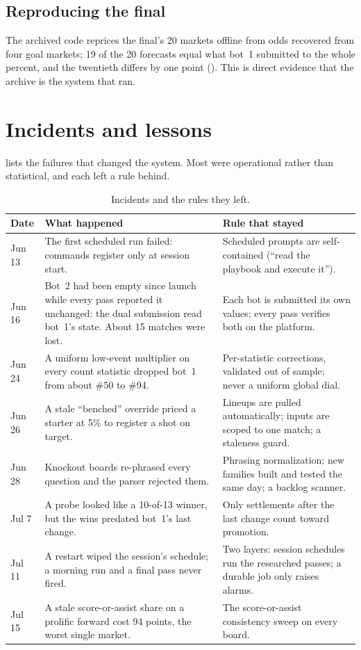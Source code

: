 \documentclass[11pt]{article}
\newcommand{\code}[1]{\texttt{\detokenize{#1}}}
\begin{document}
\subsection{Reproducing the final}

The archived code reprices the final's 20 markets offline from odds recovered from four goal
markets; 19 of the 20 forecasts equal what bot~1 submitted to the whole percent, and the
twentieth differs by one point (\code{probcup demo}). This is direct evidence that the archive
is the system that ran.

\section{Incidents and lessons}\label{sec:incidents}

 lists the failures that changed the system. Most were operational rather
than statistical, and each left a rule behind.

\begin{table}[tbp]
\centering
\caption{Incidents and the rules they left.}
\label{tab:incidents}
\begin{tabularx}{\textwidth}{@{}l L L@{}}
\toprule
Date & What happened & Rule that stayed \\
\midrule
Jun 13 & The first scheduled run failed: commands register only at session start. & Scheduled prompts are self-contained (``read the playbook and execute it''). \\
Jun 16 & Bot~2 had been empty since launch while every pass reported it unchanged: the dual submission read bot~1's state. About 15 matches were lost. & Each bot is submitted its own values; every pass verifies both on the platform. \\
Jun 24 & A uniform low-event multiplier on every count statistic dropped bot~1 from about \#50 to \#94. & Per-statistic corrections, validated out of sample; never a uniform global dial. \\
Jun 26 & A stale ``benched'' override priced a starter at 5\% to register a shot on target. & Lineups are pulled automatically; inputs are scoped to one match; a staleness guard. \\
Jun 28 & Knockout boards re-phrased every question and the parser rejected them. & Phrasing normalization; new families built and tested the same day; a backlog scanner. \\
Jul 7 & A probe looked like a 10-of-13 winner, but the wins predated bot~1's last change. & Only settlements after the last change count toward promotion. \\
Jul 11 & A restart wiped the session's schedule; a morning run and a final pass never fired. & Two layers: session schedules run the researched passes; a durable job only raises alarms. \\
Jul 15 & A stale score-or-assist share on a prolific forward cost 94 points, the worst single market. & The score-or-assist consistency sweep on every board. \\
\bottomrule
\end{tabularx}
\end{table}
\end{document}
